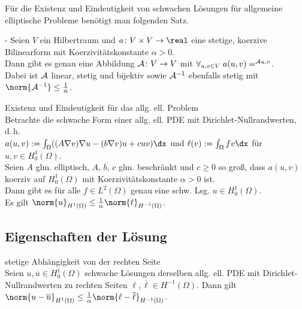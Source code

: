 \begin{Bem}
    Für die Existenz und Eindeutigkeit von schwachen Lösungen für allgemeine elliptische Probleme
    benötigt man folgenden Satz.
\end{Bem}

\begin{Satz}{-}
    Seien $V$ ein Hilbertraum und
    $a \colon V \times V \to \real$ eine stetige, koerzive Bilinearform mit
    Koerzivitätskonstante $\alpha > 0$.\\
    Dann gibt es genau eine Abbildung $\mathcal{A}\colon V \to V$ mit
    $\forall_{u, v \in V}\; a(u, v) = \sp{\mathcal{A}u, v}$.\\
    Dabei ist $\mathcal{A}$ linear, stetig und bijektiv sowie $\mathcal{A}^{-1}$ ebenfalls stetig mit
    $\norm{\A^{-1}} \le \frac{1}{\alpha}$.
\end{Satz}

\linie

\begin{Satz}{Existenz und Eindeutigkeit für das allg. ell. Problem}\\
    Betrachte die schwache Form einer allg. ell. PDE mit Dirichlet-Nullrandwerten, d.\,h.\\
    $a(u, v) := \int_\Omega ((A\nabla v) \nabla u - (b \nabla v) u + cuv) \dx$
    und $\ell(v) := \int_\Omega fv \dx$ für $u, v \in H^1_0(\Omega)$.\\
    Seien $A$ glm. elliptisch, $A$, $b$, $c$ glm. beschränkt und
    $c \ge 0$ so groß, dass $a(u, v)$ koerziv auf $H^1_0(\Omega)$ mit Koerzivitätskonstante
    $\alpha > 0$ ist.\\
    Dann gibt es für alle $f \in L^2(\Omega)$ genau eine schw. Lsg. $u \in H^1_0(\Omega)$.\\
    Es gilt $\norm{u}_{H^1(\Omega)} \le \frac{1}{\alpha} \norm{\ell}_{H^{-1}(\Omega)}$.
\end{Satz}

\subsection{%
    Eigenschaften der Lösung%
}

\begin{Satz}{stetige Abhängigkeit von der rechten Seite}\\
    Seien $u, \overline{u} \in H^1_0(\Omega)$ schwache Lösungen derselben allg. ell. PDE
    mit Dirichlet-Nullrandwerten zu rechten Seiten $\ell, \overline{\ell} \in H^{-1}(\Omega)$.
    Dann gilt $\norm{u - \overline{u}}_{H^1(\Omega)} \le
    \frac{1}{\alpha} \norm{\ell - \overline{\ell}}_{H^{-1}(\Omega)}$.
\end{Satz}

